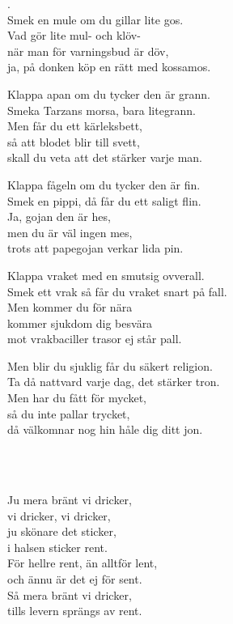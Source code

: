 .\\ 
Smek en mule om du gillar lite gos.\\ 
Vad gör lite mul- och klöv-\\ 
när man för varningsbud är döv, \\
ja, på donken köp en rätt med kossamos.

Klappa apan om du tycker den är grann.\\ 
Smeka Tarzans morsa, bara litegrann.\\ 
Men får du ett kärleksbett,\\ 
så att blodet blir till svett,\\ 
skall du veta att det stärker varje man.

Klappa fågeln om du tycker den är fin.\\
Smek en pippi, då får du ett saligt flin.\\ 
Ja, gojan den är hes,\\ 
men du är väl ingen mes,\\ 
trots att papegojan verkar lida pin.

Klappa vraket med en smutsig ovverall.\\ 
Smek ett vrak så får du vraket snart på fall.\\ 
Men kommer du för nära\\ 
kommer sjukdom dig besvära\\ 
mot vrakbaciller trasor ej står pall.

Men blir du sjuklig får du säkert religion.\\ 
Ta då nattvard varje dag, det stärker tron.\\ 
Men har du fått för mycket,\\ 
så du inte pallar trycket,\\ 
då välkomnar nog hin håle dig ditt jon.

\\



 \\       
\author{Text: Martin Johnsson}

\songtext{} 
Ju mera bränt vi dricker,\\
vi dricker, vi dricker,\\
ju skönare det sticker,\\
i halsen sticker rent.\\
För hellre rent, än alltför lent,\\
och ännu är det ej för sent.\\
Så mera bränt vi dricker,\\
tills levern sprängs av rent.\\

